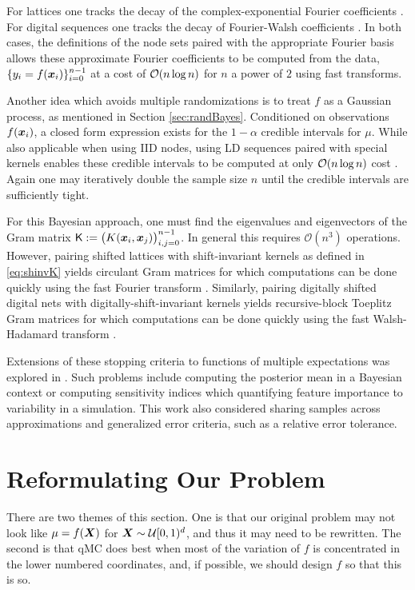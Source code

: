 \documentclass{svproc}
\begin{document}
For lattices one tracks the decay of the complex-exponential Fourier coefficients \cite{JimHic16a}. For digital sequences one tracks the decay of  Fourier-Walsh coefficients  \cite{HicJim16a}. In both cases, the definitions of the node sets paired with the appropriate Fourier basis allows these approximate Fourier coefficients to be computed from the data, $\{y_i = f({\boldsymbol{x}}_i)\}_{i=0}^{n -1} $ at a cost of ${\mathcal{O}}(n \log n)$ for $n$ a power of $2$ using fast  transforms. 

Another idea which avoids multiple randomizations is to treat $f$ as a Gaussian process, as mentioned in Section \ref{sec:randBayes}. Conditioned on observations $f({\boldsymbol{x}}_i)$, a closed form expression exists for the $1-\alpha$ credible intervals for $\mu$. While also applicable when using IID nodes, using LD sequences paired with special kernels enables these credible intervals to be computed at only ${\mathcal{O}}(n \log n)$ cost \cite{Jag19a,RatHic19a,JagHic22a}. Again one may iteratively double the sample size $n$ until the credible intervals are sufficiently tight.

For this Bayesian approach, one must find the eigenvalues and eigenvectors of the Gram matrix $\mathsf{K} : = \bigl(K({\boldsymbol{x}}_i,{\boldsymbol{x}}_j) \bigr)_{i,j=0}^{n-1}$.  In general this requires $\mathcal{O}(n^3)$ operations.  However, pairing shifted lattices with shift-invariant kernels as defined in \eqref{eq:shinvK} yields circulant Gram matrices for which computations can be done quickly using the fast Fourier transform \cite{RatHic19a}. Similarly, pairing digitally shifted digital nets with digitally-shift-invariant kernels yields recursive-block Toeplitz Gram matrices for which computations can be done quickly using the fast Walsh-Hadamard transform \cite{JagHic22a}. 

Extensions of these stopping criteria to functions of multiple expectations was explored in \cite{sorokin2022bounding}. Such problems include computing the posterior mean in a Bayesian context or computing  sensitivity indices which  quantifying feature importance to variability in a simulation. This work also considered sharing samples across approximations and generalized error criteria, such as a relative error tolerance.  

\section{Reformulating Our Problem} \label{sec:reformulate}

There are two themes of this section.  One is that our original problem may not look like $\mu = f({\boldsymbol{X}})$ for ${\boldsymbol{X}} \sim \mathcal{U}[0,1)^d$, and thus it may need to be rewritten.  The second is that qMC does best when most of the variation of $f$ is concentrated in the lower numbered coordinates, and, if possible, we should design $f$ so that this is so.
\end{document}

